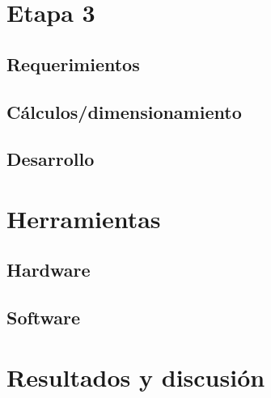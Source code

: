 

\lipsum[0-3]

\section{Etapa 3}
\subsection{Requerimientos}
\subsection{C\'alculos/dimensionamiento}

\subsection{Desarrollo }

\section{Herramientas}

\subsection{Hardware}
\subsection{Software}

\section{Resultados y discusi\'on}



